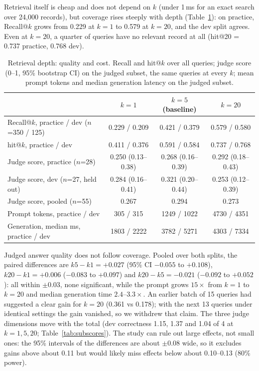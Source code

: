 \documentclass{article}
\begin{document}
Retrieval itself is cheap and does not depend on $k$ (under 1\,ms for an exact search over 24{,}000 records), but coverage rises steeply with depth (Table~\ref{tab:rag}): on practice, Recall@$k$ grows from 0.229 at $k=1$ to 0.579 at $k=20$, and the dev split agrees. Even at $k=20$, a quarter of queries have no relevant record at all (hit@20 = 0.737 practice, 0.768 dev).

\begin{table}[t]
\caption{Retrieval depth: quality and cost. Recall and hit@$k$ over all queries; judge score (0--1, 95\% bootstrap CI) on the judged subset, the same queries at every $k$; mean prompt tokens and median generation latency on the judged subset.}
\label{tab:rag}
\begin{center}
\footnotesize
\setlength{\tabcolsep}{4pt}
\begin{tabular}{lccc}
\toprule
 & $k=1$ & $k=5$ (baseline) & $k=20$ \\
\midrule
Recall@$k$, practice / dev ($n$=350 / 125) & 0.229 / 0.209 & 0.421 / 0.379 & 0.579 / 0.580 \\
hit@$k$, practice / dev & 0.411 / 0.376 & 0.591 / 0.584 & 0.737 / 0.768 \\
\midrule
Judge score, practice ($n$=28) & 0.250 (0.13--0.38) & 0.268 (0.16--0.39) & 0.292 (0.18--0.43) \\
Judge score, dev ($n$=27, held out) & 0.284 (0.16--0.41) & 0.321 (0.20--0.44) & 0.253 (0.12--0.39) \\
Judge score, pooled ($n$=55) & 0.267 & 0.294 & 0.273 \\
\midrule
Prompt tokens, practice / dev & 305 / 315 & 1249 / 1022 & 4730 / 4351 \\
Generation, median ms, practice / dev & 1803 / 2222 & 3782 / 5271 & 4303 / 7334 \\
\bottomrule
\end{tabular}
\end{center}
\end{table}

Judged answer quality does not follow coverage. Pooled over both splits, the paired differences are $k5-k1=+0.027$ (95\% CI $-0.055$ to $+0.108$), $k20-k1=+0.006$ ($-0.083$ to $+0.097$) and $k20-k5=-0.021$ ($-0.092$ to $+0.052$): all within $\pm0.03$, none significant, while the prompt grows $15\times$ from $k=1$ to $k=20$ and median generation time $2.4$--$3.3\times$. An earlier batch of 15 queries had suggested a clear gain for $k=20$ (0.361 vs 0.178); with the next 13 queries under identical settings the gain vanished, so we withdrew that claim. The three judge dimensions move with the total (dev correctness 1.15, 1.37 and 1.04 of 4 at $k=1,5,20$; Table~\ref{tab:subscores}). The study can rule out large effects, not small ones: the 95\% intervals of the differences are about $\pm0.08$ wide, so it excludes gains above about 0.11 but would likely miss effects below about 0.10--0.13 (80\% power).
\end{document}

